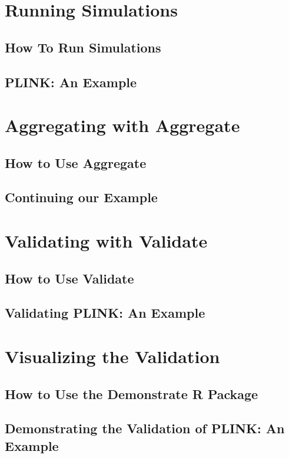 \documentclass[twoside,a4paper]{refart}
\begin{document}
\section{Running Simulations}


\subsection{How To Run Simulations}

\subsection{PLINK: An Example}


\section{Aggregating with Aggregate}
\label{layout}

\subsection{How to Use Aggregate}

\subsection{Continuing our Example}

\section{Validating with Validate}

\subsection{How to Use Validate}

\subsection{Validating PLINK: An Example}

\section{Visualizing the Validation}

\subsection{How to Use the Demonstrate R Package}

\subsection{Demonstrating the Validation of PLINK: An Example}
\end{document}
